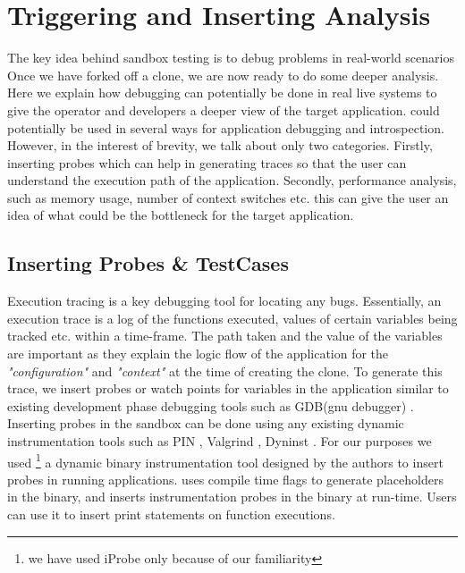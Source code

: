 \section{Triggering and Inserting Analysis}
\label{sec:trigger}

The key idea behind sandbox testing is to debug problems in real-world scenarios
Once we have forked off a clone, we are now ready to do some deeper analysis. 
Here we explain how debugging can potentially be done in real live systems to give the operator and developers a deeper view of the target application.
\parikshan could potentially be used in several ways for application debugging and introspection. 
However, in the interest of brevity, we talk about only two categories. 
Firstly, inserting probes which can help in generating traces so that the user can understand the execution path of the application.
Secondly, performance analysis, such as memory usage, number of context switches etc. this can give the user an idea of what could be the bottleneck for the target application.


\subsection{Inserting Probes \& TestCases}
\label{sec:unitTests}

Execution tracing is a key debugging tool for locating any bugs. 
Essentially, an execution trace is a log of the functions executed, values of certain variables being tracked etc. within a time-frame.
The path taken and the value of the variables are important as they explain the logic flow of the application for the \emph{"configuration"} and \emph{"context"} at the time of creating the clone.
To generate this trace, we insert probes or watch points for variables in the application similar to existing development phase debugging tools such as GDB(gnu debugger) \cite{gdb}.
Inserting probes in the sandbox can be done using any existing dynamic instrumentation tools  such as PIN \cite{pin}, Valgrind \cite{valgrind}, Dyninst \cite{dyninst}.
For our purposes we used \iprobe\footnote{we have used iProbe only because of our familiarity} \cite{iProbe} a dynamic binary instrumentation tool designed by the authors to insert probes in running applications. 
 \iprobe uses compile time flags to generate placeholders in the binary, and inserts instrumentation probes in the binary at run-time.
Users can use it to insert print statements on function executions. 



